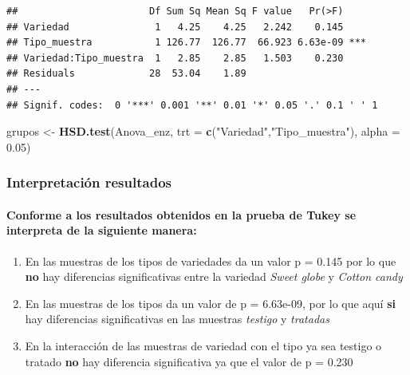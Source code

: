 \documentclass[
]{article}
\newenvironment{Shaded}{\begin{snugshade}}{\end{snugshade}}
\newcommand{\AttributeTok}[1]{\textcolor[rgb]{0.13,0.29,0.53}{#1}}
\newcommand{\FloatTok}[1]{\textcolor[rgb]{0.00,0.00,0.81}{#1}}
\newcommand{\FunctionTok}[1]{\textcolor[rgb]{0.13,0.29,0.53}{\textbf{#1}}}
\newcommand{\NormalTok}[1]{#1}
\newcommand{\OtherTok}[1]{\textcolor[rgb]{0.56,0.35,0.01}{#1}}
\newcommand{\StringTok}[1]{\textcolor[rgb]{0.31,0.60,0.02}{#1}}
\begin{document}
\begin{verbatim}
##                       Df Sum Sq Mean Sq F value   Pr(>F)    
## Variedad               1   4.25    4.25   2.242    0.145    
## Tipo_muestra           1 126.77  126.77  66.923 6.63e-09 ***
## Variedad:Tipo_muestra  1   2.85    2.85   1.503    0.230    
## Residuals             28  53.04    1.89                     
## ---
## Signif. codes:  0 '***' 0.001 '**' 0.01 '*' 0.05 '.' 0.1 ' ' 1
\end{verbatim}

\begin{Shaded}
\begin{Highlighting}[]
\NormalTok{grupos }\OtherTok{\textless{}{-}} \FunctionTok{HSD.test}\NormalTok{(Anova\_enz, }\AttributeTok{trt =} \FunctionTok{c}\NormalTok{(}\StringTok{"Variedad"}\NormalTok{,}\StringTok{"Tipo\_muestra"}\NormalTok{),}
                  \AttributeTok{alpha =} \FloatTok{0.05}\NormalTok{)}
\end{Highlighting}
\end{Shaded}

\hypertarget{interpretaciuxf3n-resultados}{%
\subsubsection{\texorpdfstring{\textbf{Interpretación
resultados}}{Interpretación resultados}}\label{interpretaciuxf3n-resultados}}

\hypertarget{conforme-a-los-resultados-obtenidos-en-la-prueba-de-tukey-se-interpreta-de-la-siguiente-manera}{%
\paragraph{Conforme a los resultados obtenidos en la prueba de Tukey se
interpreta de la siguiente
manera:}\label{conforme-a-los-resultados-obtenidos-en-la-prueba-de-tukey-se-interpreta-de-la-siguiente-manera}}

\begin{enumerate}
\def\labelenumi{\arabic{enumi}.}
\item
  En las muestras de los tipos de variedades da un valor p = 0.145 por
  lo que \textbf{no} hay diferencias significativas entre la variedad
  \emph{Sweet globe} y \emph{Cotton candy}
\item
  En las muestras de los tipos da un valor de p = 6.63e-09, por lo que
  aquí \textbf{si} hay diferencias significativas en las muestras
  \emph{testigo} y \emph{tratadas}
\item
  En la interacción de las muestras de variedad con el tipo ya sea
  testigo o tratado \textbf{no} hay diferencia significativa ya que el
  valor de p = 0.230
\end{enumerate}
\end{document}

